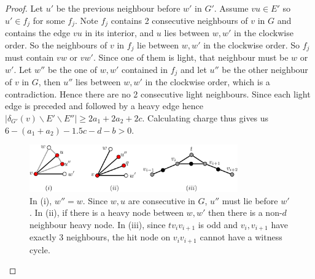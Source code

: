 \documentclass{article}
\newcommand{\0}{\mathbb{0}}
\newcommand{\1}{\mathbb{1}}
\begin{document}
\begin{proof}
Let $u'$ be the previous neighbour before $w'$ in $G'$. %
Assume $vu \in  E'$ so $u' \in f_j$ for some $f_j$. Note  $f_j$ contains 2 consecutive neighbours of $v$ in $G$ and contains the edge $vu$ in its interior, and $u$ lies between $w,w'$ in the clockwise order. So the neighbours of $v$ in $f_j$ lie between $w,w'$ in the clockwise order. So $f_j$ must contain  $vw$ or  $ vw'$.  Since one of them is light, that neighbour must be $w$ or $w'$.  Let  $w''$ be the  one of $w,w'$ contained in $f_j$ and let $u''$ be the other neighbour of $v$ in $G$, then $u''$ lies between $w,w'$ in the clockwise order, which is a contradiction.  %
Hence there are no 2 consecutive light neighbours.  
Since each light edge is preceded and followed by a heavy edge hence $ |\delta_{G'}(v) \backslash E' \backslash E'' | \geq  2a_1 +2a_2+2c$. Calculating charge thus gives us $ 6-(a_1+a_2) -1.5c -d -b > 0 $.
\begin{figure}[h]
\begin{center}
\includegraphics[width=0.8\textwidth]{b-faceAndLastdnodeAndConhit.pdf}
\caption{In (i), $w''=w$. Since $w,u$ are consecutive in $G$, $u''$ must lie before $w'$. In (ii), if there is a heavy node between $w,w'$ then there is a non-$d$ neighbour heavy node. In (iii), since $t v_i v_{i+1}$ is odd and $v_i, v_{i+1}$ have exactly 3 neighbours, the hit node on $v_iv_{i+1}$ cannot have a witness cycle. \label{b-faceAndLastdnodeAndCon}}
        \end{center}
\end{figure}
\end{proof}
\end{document}
